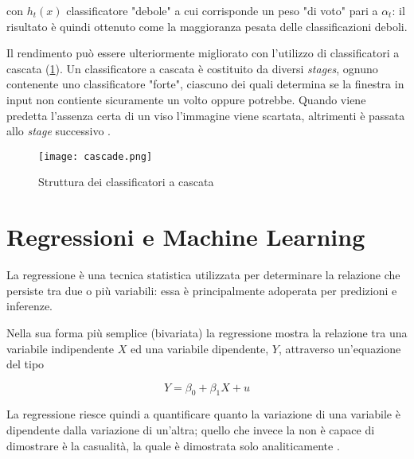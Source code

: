 con $h_t(x)$ classificatore "debole" a cui corrisponde un peso "di voto" pari a $\alpha_t$:
il risultato è quindi ottenuto come la maggioranza pesata delle classificazioni deboli.

\medskip

Il rendimento può essere ulteriormente migliorato con l'utilizzo di classificatori a cascata 
(\ref{fig:cascade}). Un classificatore a cascata è costituito da diversi \textit{stages}, 
ognuno contenente uno classificatore "forte", ciascuno dei quali determina se la finestra in 
input non contiente sicuramente un volto oppure potrebbe. Quando viene predetta l'assenza 
certa di un viso l'immagine viene scartata, altrimenti è passata allo \textit{stage} successivo 
\cite{Datta2015}.

\begin{figure}
    \begin{small}
        \begin{center}
            \texttt{[image: cascade.png]}
        \end{center}
        \caption{Struttura dei classificatori a cascata \cite{Datta2015}}
        \label{fig:cascade}
    \end{small}
\end{figure}

\newpage

\section{Regressioni e Machine Learning}
\label{section:regression_ml}

La regressione è una tecnica statistica utilizzata per determinare la relazione che persiste tra
due o più variabili: essa è principalmente adoperata per predizioni e inferenze.

Nella sua forma più semplice (bivariata) la regressione mostra la relazione tra una variabile 
indipendente $X$ ed una variabile dipendente, $Y$, attraverso un'equazione del tipo

\begin{equation}
    Y = \beta_0 + \beta_1 X + u
    \label{eq:biv_regression}
\end{equation}

La regressione riesce quindi a quantificare quanto la variazione di una variabile è dipendente 
dalla variazione di un'altra; quello che invece la non è capace di dimostrare è la casualità, 
la quale è dimostrata solo analiticamente \cite{campbell2008introduction}.

